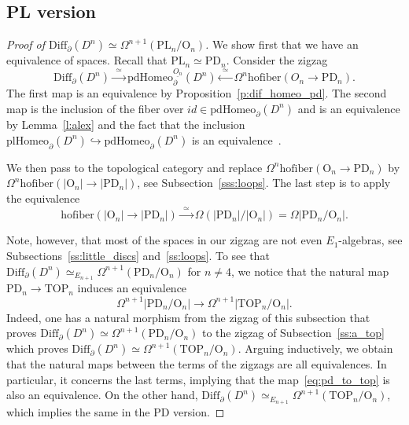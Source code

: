 \documentclass[11pt]{amsart}
\theoremstyle{definition}
\newcommand{\Diffn}{\mathrm{Diff}_\partial(D^n)}
\newcommand{\plHomeo}{\mathrm{plHomeo}}
\newcommand{\pdHomeo}{\mathrm{pdHomeo}}
\newcommand{\PL}{\mathrm{PL}}
\newcommand{\TOP}{\mathrm{TOP}}
\newcommand{\OO}{\mathrm{O}}
\newcommand{\PD}{\mathrm{PD}}
\newcommand{\hofiber}{\mathrm{hofiber}}
\numberwithin{equation}{section}
\begin{document}
\subsection{PL version}\label{ss:a_pl}
\begin{proof}[Proof of $\Diffn\simeq\Omega^{n+1}(\PL_n/\OO_n)$]
We show first that we have an equivalence of spaces. 
Recall that $\PL_n \simeq \PD_n$. %
Consider the zigzag
\[
\Diffn\xrightarrow{\,\,\simeq\,\,}\pdHomeo_\partial^{\underline{O_n}}(D^n)\xleftarrow{\,\,\simeq\,\,}\Omega^n\hofiber\left(O_n\to\PD_n\right).
\]
The first map is an equivalence by Proposition~\ref{p:dif_homeo_pd}. The second map is the inclusion of the fiber over $id\in\pdHomeo_\partial(D^n)$
and is an equivalence by Lemma~\ref{l:alex} and the fact that the inclusion $\plHomeo_\partial(D^n) \hookrightarrow\pdHomeo_\partial(D^n)$
is an equivalence~\cite{BLR_aut}. 

We then pass to the topological category and replace $\Omega^n\hofiber\left(\OO_n\to\PD_n\right)$ by $\Omega^n\hofiber\left(|\OO_n|\to|\PD_n|\right)$,
see Subsection~\ref{sss:loops}. The last step is to apply the equivalence
\[
\hofiber\left(|\OO_n|\to|\PD_n|\right)\xrightarrow{\,\,\simeq\,\,} \Omega(|\PD_n|/|\OO_n|)=\Omega|\PD_n/\OO_n|.
\]

Note, however, that most of the spaces in our zigzag are not even $E_1$-algebras, see Subsections~\ref{ss:little_discs} and~\ref{ss:loops}.
To see that $\Diffn\simeq_{E_{n+1}}\Omega^{n+1}(\PD_n/\OO_n)$ for $n\neq 4$, we notice that the natural map $\PD_n\to\TOP_n$
induces an equivalence 
\begin{equation}\label{eq:pd_to_top}
\Omega^{n+1}|\PD_n/\OO_n|\to \Omega^{n+1}|\TOP_n/\OO_n|.
\end{equation}
 Indeed, one has a natural morphism from the 
zigzag of this subsection that proves $\Diffn\simeq\Omega^{n+1}(\PD_n/\OO_n)$ to the zigzag of Subsection~\ref{ss:a_top} which proves
$\Diffn\simeq\Omega^{n+1}(\TOP_n/\OO_n)$. Arguing inductively, we obtain that the natural maps between the terms of the zigzags are all equivalences. In particular, it concerns the last terms, implying that the map~\eqref{eq:pd_to_top} is also an equivalence. On the other hand, $\Diffn\simeq_{E_{n+1}}\Omega^{n+1}(\TOP_n/\OO_n)$,
which implies the same in the PD version.
\end{proof}
\end{document}
